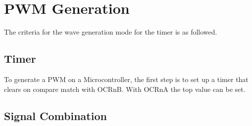 \setchapterpreamble[u]{\margintoc}

\chapter{PWM Generation}

The criteria for the wave generation mode for the timer is  as followed. 

\section{Timer}

To generate a PWM on a Microcontroller, the first step is to set up a timer that clears on compare match with OCRnB. With OCRnA the top value can be set.

\section{Signal Combination}